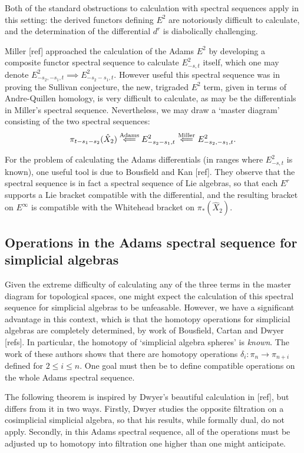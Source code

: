 \documentclass[11pt]{article}
\begin{document}
Both of the standard obstructions to calculation with spectral sequences apply in this setting: the derived functors defining $E^2$ are notoriously difficult to calculate, and the determination of the differential $d^r$ is diabolically challenging. 





Miller [ref] approached the calculation of the Adams $E^2$ by developing a composite functor spectral sequence to calculate $E^2_{-s,t}$ itself, which one may denote $E^2_{-s_2,-s_1,t}\implies E^2_{-s_2-s_1,t}$. However useful this spectral sequence was in proving the Sullivan conjecture, the new, trigraded $E^2$ term, given in terms of Andre-Quillen homology, is very difficult to calculate, as may be the differentials in Miller's spectral sequence. Nevertheless, we may draw a `master diagram' consisting of the two spectral sequences:
\[\pi_{t-s_1-s_2}(\hat X_2)\overset{\textup{Adams}}{\impliedby}E^2_{-s_2-s_1,t}\overset{\textup{Miller}}{\impliedby} E^2_{-s_2,-s_1,t}.\]

For the problem of calculating the Adams differentials (in ranges where $E^2_{-s,t}$ is known), one useful tool is due to Bousfield and Kan [ref]. They observe that the spectral sequence is in fact a spectral sequence of Lie algebras, so that each $E^r$ supports a Lie bracket compatible with the differential, and the resulting bracket on $E^\infty$ is compatible with the Whitehead bracket on $\pi_*(\hat X_2)$.



\subsection*{Operations in the Adams spectral sequence for simplicial algebras}
Given the extreme difficulty of calculating any of the three terms in the master diagram for topological spaces, one might expect the calculation of this spectral sequence for simplicial algebras to be unfeasable. However, we have a significant advantage in this context, which is that the homotopy operations for simplicial algebras are completely determined, by work of Bousfield, Cartan and Dwyer [refs]. In particular, the homotopy of `simplicial algebra spheres' is \emph{known}. The work of these authors shows that there are homotopy operations $\delta_i:\pi_{n}\to\pi_{n+i}$ defined for $2\leq i\leq n$.
One goal must then be to define compatible operations on the whole Adams spectral sequence.

The following theorem is inspired by Dwyer's beautiful calculation in [ref], but differs from it in two ways. Firstly, Dwyer studies the opposite filtration on a cosimplicial simplicial algebra, so that his results, while formally dual, do not apply. Secondly, in this Adams spectral sequence, all of the operations must be adjusted up to homotopy into filtration one higher than one might anticipate.
\end{document}

